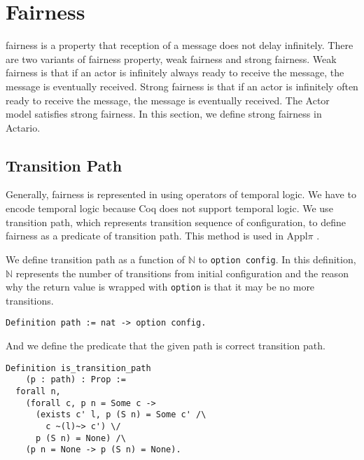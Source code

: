 \section{Fairness}
\label{sec:fairness}

\textsf{fairness} is a property that reception of a message does not delay infinitely.
There are two variants of fairness property, weak fairness and strong fairness.
Weak fairness is that if an actor is infinitely always ready to receive the message, the message is eventually received.
Strong fairness is that if an actor is infinitely often ready to receive the message, the message is eventually received.
The Actor model satisfies strong fairness.
In this section, we define strong fairness in Actario.

\subsection{Transition Path}
Generally, fairness is represented in using operators of temporal logic.
We have to encode temporal logic because Coq does not support temporal logic.
We use transition path, which represents transition sequence of configuration, to define fairness as a predicate of transition path.
This method is used in Appl$\pi$ \cite{Affeldt200817}.

We define transition path as a function of $\mathbb{N}$ to \texttt{option config}.
In this definition, $\mathbb{N}$ represents the number of transitions from initial configuration and the reason why the return value is wrapped with \texttt{option} is that it may be no more transitions.

\begin{lstlisting}
Definition path := nat -> option config.
\end{lstlisting}

And we define the predicate that the given path is correct transition path.

\begin{lstlisting}
Definition is_transition_path
    (p : path) : Prop :=
  forall n,
    (forall c, p n = Some c ->
      (exists c' l, p (S n) = Some c' /\
        c ~(l)~> c') \/
      p (S n) = None) /\
    (p n = None -> p (S n) = None).
\end{lstlisting}


